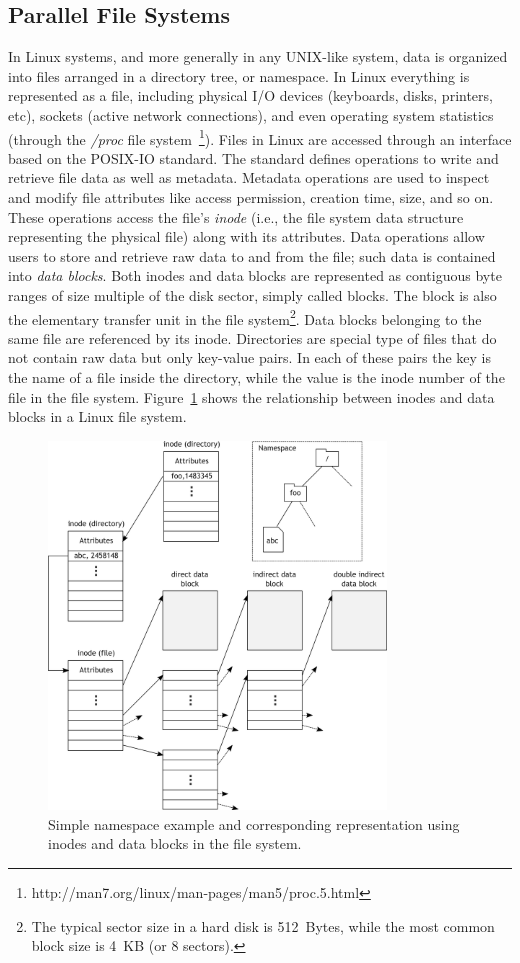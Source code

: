 \subsection{Parallel File Systems}
In Linux systems, and more generally in any UNIX-like system, data is organized into files arranged in a directory tree, or namespace. In Linux everything is represented as a file, including physical I/O 
devices (keyboards, disks, printers, etc), sockets (active network connections), and even operating system statistics (through the \textit{/proc} file system~\footnote{http://man7.org/linux/man-pages/man5/proc.5.html}). 
Files in Linux are accessed through an interface based on the POSIX-IO standard. The standard defines operations to write and retrieve file data as well as metadata. Metadata operations are used to inspect and modify 
file attributes like access permission, creation time, size, and so on. These operations access the file's \textit{inode} (i.e., the file system data structure representing the physical file) along with its attributes. 
Data operations allow users to store and retrieve raw data to and from the file; such data is contained into \textit{data blocks}. Both inodes and data blocks are represented as contiguous byte ranges of size multiple 
of the disk sector, simply called blocks. The block is also the elementary transfer unit in the file system\footnote{The typical sector size in a hard disk is 512~Bytes, while the most common block size is 4~KB (or 8 
sectors).}. Data blocks belonging to the same file are referenced by its inode. Directories are special type of files that do not contain raw data but only key-value pairs. In each of these pairs the key is the name of 
a file inside the directory, while the value is the inode number of the file in the file system. Figure~\ref{figure: inode} shows the relationship between inodes and data blocks in a Linux file system.

\begin{figure}[!htb]
\centering
\includegraphics[width=0.8\textwidth]{figures/inode}
\caption{Simple namespace example and corresponding representation using inodes and data blocks in the file system.}
\label{figure: inode}
\end{figure}

